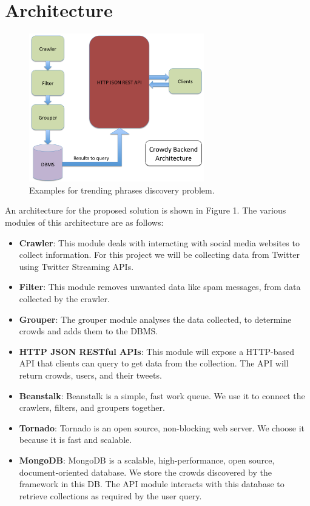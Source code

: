 \documentclass{sig-alternate}
\begin{document}
\section{Architecture}
\label{sec:architecture}
\begin{figure}[!t]
\begin{center}
\includegraphics[width=3.0in]{images/architecture}
\caption{Examples for trending phrases discovery problem.}
\label{fig:candidate_phrases}
\end{center}
\end{figure}

An architecture for the proposed solution is shown in Figure 1. The various modules of this architecture are as follows:

\begin{itemize}
  \item \noindent\textbf{Crawler}: This module deals with interacting with social media websites to collect information. For this project we will be collecting data from Twitter using Twitter Streaming APIs.
  \item \noindent\textbf{Filter}: This module removes unwanted data like spam messages, from data collected by the crawler.
  \item \noindent\textbf{Grouper}: The grouper module analyses the data collected, to determine crowds and adds them to the DBMS. 
  \item \noindent\textbf{HTTP JSON RESTful APIs}: This module will expose a HTTP-based API that clients can query to get data from the collection. The API will return crowds, users, and their tweets.
\end{itemize}

\begin{itemize}
  \item \noindent\textbf{Beanstalk}: Beanstalk is a simple, fast work queue. We use it to connect the crawlers, filters, and groupers together.
   \item \noindent\textbf{Tornado}: Tornado is an open source, non-blocking web server.  We choose it because it is fast and scalable.
   \item \noindent\textbf{MongoDB}: MongoDB is a scalable, high-performance, open source, document-oriented database. We store the crowds discovered by the framework in this DB. The API module interacts with this database to retrieve collections as required by the user query.
\end{itemize}
\end{document}
